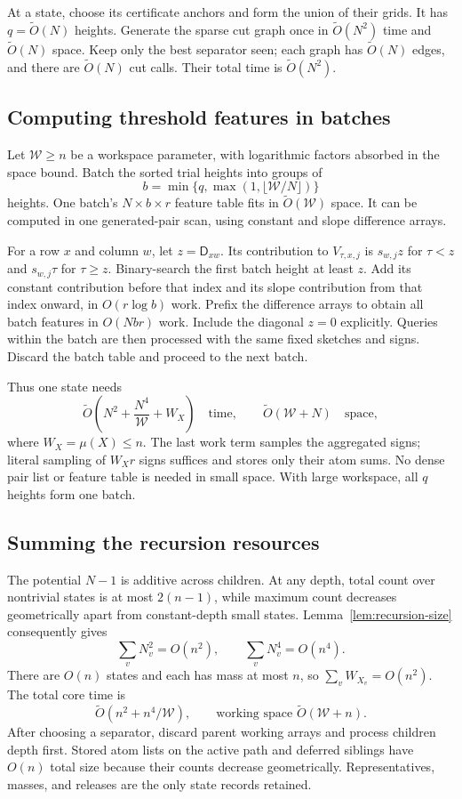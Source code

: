 \documentclass[11pt]{article}
\theoremstyle{definition}
\newcommand{\wt}{\widetilde}
\begin{document}
At a state, choose its certificate anchors and form the union of their
grids. It has $q=\wt O(N)$ heights. Generate the sparse cut graph
once in $\wt O(N^2)$ time and $\wt O(N)$ space. Keep only the best
separator seen; each graph has $\wt O(N)$ edges, and there are
$\wt O(N)$ cut calls. Their total time is $\wt O(N^2)$.

\subsection{Computing threshold features in batches}

Let $\mathcal W\ge n$ be a workspace parameter, with logarithmic
factors absorbed in the space bound. Batch the sorted trial heights
into groups of
\[
 b=\min\{q,\max(1,\lfloor\mathcal W/N\rfloor)\}
\]
heights. One batch's $N\times b\times r$ feature table fits in
$\wt O(\mathcal W)$ space. It can be computed in one generated-pair
scan, using constant and slope difference arrays.

For a row $x$ and column $w$, let $z=\mathsf D_{xw}$. Its contribution to
$V_{\tau,x,j}$ is $s_{w,j}z$ for $\tau<z$ and $s_{w,j}\tau$ for
$\tau\ge z$. Binary-search the first batch height at least $z$.
Add its constant contribution before that index and its slope
contribution from that index onward, in $O(r\log b)$ work.
Prefix the difference arrays to obtain all batch features in
$O(Nbr)$ work. Include the diagonal $z=0$ explicitly. Queries within
the batch are then processed with the same fixed sketches and signs.
Discard the batch table and proceed to the next batch.

Thus one state needs
\[
 \wt O\left(N^2+\frac{N^4}{\mathcal W}+W_X\right)
 \quad\text{time},\qquad
 \wt O(\mathcal W+N)\quad\text{space},
\]
where $W_X=\mu(X)\le n$. The last work term samples the aggregated
signs; literal sampling of $W_Xr$ signs suffices and stores only their
atom sums. No dense pair list or feature table is needed in small space.
With large workspace, all $q$ heights form one batch.

\subsection{Summing the recursion resources}

The potential $N-1$ is additive across children. At any depth, total
count over nontrivial states is at most $2(n-1)$, while maximum count
decreases geometrically apart from constant-depth small states.
Lemma~\ref{lem:recursion-size} consequently gives
\[
 \sum_v N_v^2=O(n^2),\qquad
 \sum_v N_v^4=O(n^4).
\]
There are $O(n)$ states and each has mass at most $n$, so
$\sum_v W_{X_v}=O(n^2)$. The total core time is
\begin{equation}\label{l2:eq:tradeoff}
 \boxed{\wt O(n^2+n^4/\mathcal W)},
 \qquad\text{working space }\wt O(\mathcal W+n).
\end{equation}
After choosing a separator, discard parent working arrays and process
children depth first. Stored atom lists on the active path and deferred
siblings have $O(n)$ total size because their counts decrease
geometrically. Representatives, masses, and releases are the only
state records retained.
\end{document}
